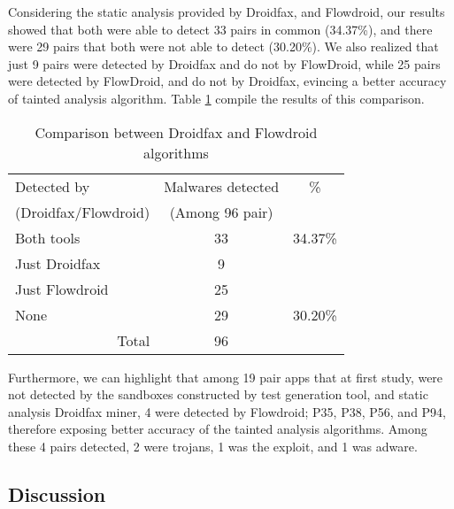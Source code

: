 Considering the static analysis provided by Droidfax, and Flowdroid, our results showed that both were able to detect 33 pairs in common (34.37\%), and there were 29 pairs that both were not able to detect (30.20\%). We also realized that just 9 pairs were detected by Droidfax and do not by FlowDroid, while 25 pairs were detected by FlowDroid, and do not by Droidfax, evincing a better accuracy of tainted analysis algorithm. Table \ref{tab:comparison} compile the results of this comparison.

\begin{table}[htb]
\centering
\begin{tabular}{lcc}\toprule

Detected by  & Malwares detected & \%   \\ 
(Droidfax/Flowdroid) & (Among 96 pair) & \\ \midrule
Both tools & 33 & 34.37\%  \\
Just Droidfax & 9 &  \\
Just Flowdroid & 25 &  \\
None & 29 & 30.20\% \\\midrule
 
\multicolumn{1}{r}{Total} &   96 \\ \bottomrule
\end{tabular} 
\caption{Comparison between Droidfax and Flowdroid algorithms}
\label{tab:comparison}
\end{table}


Furthermore, we can highlight that among 19 pair apps that at first study, were not detected by the sandboxes constructed by test generation tool, and static analysis Droidfax miner, 4 were detected by Flowdroid; P35, P38, P56, and P94, therefore exposing better accuracy of the tainted analysis algorithms. Among these 4 pairs detected, 2 were trojans, 1 was the exploit, and 1 was adware.

\subsection{Discussion}\label{sec:discussion}

